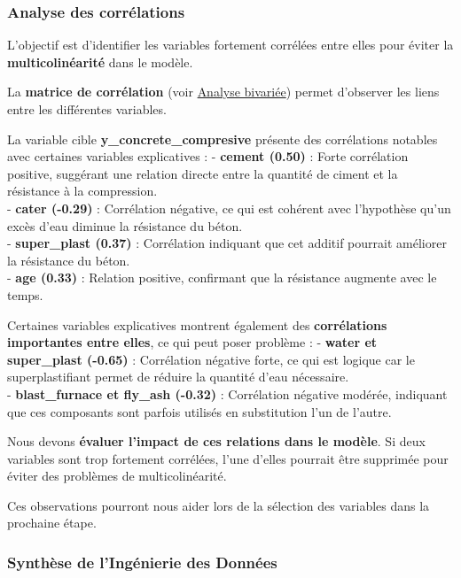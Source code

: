 \documentclass[
  12pt,
]{article}
\begin{document}
\subsubsection{Analyse des
corrélations}\label{analyse-des-corruxe9lations}

L'objectif est d'identifier les variables fortement corrélées entre
elles pour éviter la \textbf{multicolinéarité} dans le modèle.

La \textbf{matrice de corrélation} (voir
\hyperref[matrice-de-correlation]{Analyse bivariée}) permet d'observer
les liens entre les différentes variables.

La variable cible \textbf{y\_concrete\_compresive} présente des
corrélations notables avec certaines variables explicatives : -
\textbf{cement (0.50)} : Forte corrélation positive, suggérant une
relation directe entre la quantité de ciment et la résistance à la
compression.\\
- \textbf{cater (-0.29)} : Corrélation négative, ce qui est cohérent
avec l'hypothèse qu'un excès d'eau diminue la résistance du béton.\\
- \textbf{super\_plast (0.37)} : Corrélation indiquant que cet additif
pourrait améliorer la résistance du béton.\\
- \textbf{age (0.33)} : Relation positive, confirmant que la résistance
augmente avec le temps.

Certaines variables explicatives montrent également des
\textbf{corrélations importantes entre elles}, ce qui peut poser
problème : - \textbf{water et super\_plast (-0.65)} : Corrélation
négative forte, ce qui est logique car le superplastifiant permet de
réduire la quantité d'eau nécessaire.\\
- \textbf{blast\_furnace et fly\_ash (-0.32)} : Corrélation négative
modérée, indiquant que ces composants sont parfois utilisés en
substitution l'un de l'autre.

Nous devons \textbf{évaluer l'impact de ces relations dans le modèle}.
Si deux variables sont trop fortement corrélées, l'une d'elles pourrait
être supprimée pour éviter des problèmes de multicolinéarité.

Ces observations pourront nous aider lors de la sélection des variables
dans la prochaine étape.

\subsubsection{Synthèse de l'Ingénierie des
Données}\label{synthuxe8se-de-linguxe9nierie-des-donnuxe9es}
\end{document}
